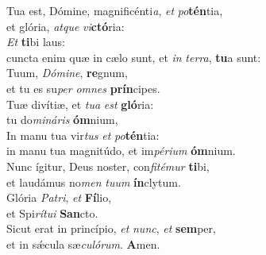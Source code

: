 \evenverse Tua est, Dómine, magnificénti\textit{a}, \textit{et} \textit{po}\textbf{tén}tia,~\*\\
\evenverse et glória, \textit{at}\textit{que} \textit{vi}\textbf{ctó}ria:\\
\oddverse \textit{Et} \textbf{ti}bi laus:~\*\\
\oddverse cuncta enim quæ in cælo sunt, et \textit{in} \textit{ter}\textit{ra}, \textbf{tu}a sunt:\\
\evenverse Tuum, \textit{Dó}\textit{mi}\textit{ne}, \textbf{re}gnum,~\*\\
\evenverse et tu es su\textit{per} \textit{om}\textit{nes} \textbf{prín}cipes.\\
\oddverse Tuæ divítiæ, et \textit{tu}\textit{a} \textit{est} \textbf{gló}ria:~\*\\
\oddverse tu do\textit{mi}\textit{ná}\textit{ris} \textbf{óm}nium,\\
\evenverse In manu tua vir\textit{tus} \textit{et} \textit{po}\textbf{tén}tia:~\*\\
\evenverse in manu tua magnitúdo, et im\textit{pé}\textit{ri}\textit{um} \textbf{óm}nium.\\
\oddverse Nunc ígitur, Deus noster, con\textit{fi}\textit{té}\textit{mur} \textbf{ti}bi,~\*\\
\oddverse et laudámus no\textit{men} \textit{tu}\textit{um} \textbf{ín}clytum.\\
\evenverse Glória \textit{Pa}\textit{tri}, \textit{et} \textbf{Fí}lio,~\*\\
\evenverse et Spi\textit{rí}\textit{tu}\textit{i} \textbf{San}cto.\\
\oddverse Sicut erat in princípio, \textit{et} \textit{nunc}, \textit{et} \textbf{sem}per,~\*\\
\oddverse et in sǽcula sæ\textit{cu}\textit{ló}\textit{rum}. \textbf{A}men.\\
